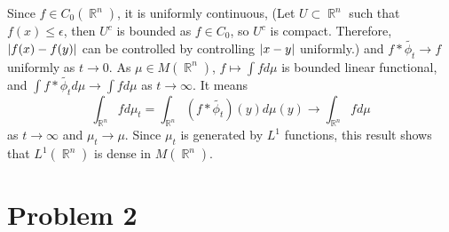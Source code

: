\documentclass{article}
\DeclareMathOperator{\rr}{\mathbb{R}}
\begin{document}
Since $f\in C_0(\rr^n)$, it is uniformly continuous, (Let $U\subset \rr^n$ such that $f(x)\leq \epsilon$, then $U^c$ is bounded as $f\in C_0$, so $U^c$ is compact. Therefore, $\abs{f(x)-f(y)}$ can be controlled by controlling $\abs{x-y}$ uniformly.) and $f*\tilde{\phi_t}\rightarrow f$ uniformly as $t\rightarrow 0$. As $\mu\in M(\rr^n)$, $f\mapsto \int fd\mu$ is bounded linear functional, and $\int f*\tilde{\phi_t} d\mu\rightarrow \int f d\mu$ as $t\rightarrow \infty$. It means
\begin{equation*}
\int_{\rr^n} fd\mu_t=\int_{\rr^n} (f*\tilde{\phi_t})(y)d\mu(y)\rightarrow \int_{\rr^n} fd\mu
\end{equation*}
as $t\rightarrow \infty$ and $\mu_t\rightarrow\mu$. Since $\mu_t$ is generated by $L^1$ functions, this result shows that $L^1(\rr^n)$ is dense in $M(\rr^n)$.
\section*{Problem 2}
\end{document}
